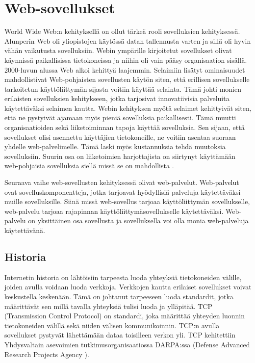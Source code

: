 \documentclass[utf8]{gradu3}
\begin{document}
\chapter{Web-sovellukset}
World Wide Web:n kehityksellä on ollut tärkeä rooli sovelluksien kehityksessä. Alunperin Web oli yliopistojen käytössä datan tallennusta varten ja sillä oli hyvin vähän vaikutusta sovelluksiin. Webin ympärille kirjoitetut sovellukset olivat käynnissä paikallisissa tietokoneissa ja niihin oli vain pääsy organisaation sisällä. 2000-luvun alussa Web alkoi kehittyä laajemmin. Selaimiin lisätyt ominaisuudet mahdollistivat Web-pohjaisten sovellusten käytön siten, että erillisen sovellukselle tarkoitetun käyttöliittymän sijasta voitiin käyttää selainta. Tämä johti monien erilaisten sovelluksien kehitykseen, jotka tarjosivat innovatiivisia palveluita käytettäväksi selaimen kautta. Webin kehityksen myötä selaimet kehittyivät siten, että ne pystyivät ajamaan myös pieniä sovelluksia paikallisesti. Tämä muutti organisaatioiden sekä liiketoiminnan tapoja käyttää sovelluksia. Sen sijaan, että sovellukset olisi asennettu käyttäjien tietokoneille, ne voitiin asentaa suoraan yhdelle web-palvelimelle. Tämä laski myös kustannuksia tehdä muutoksia sovelluksiin. Suurin osa on liiketoimien harjottajista on siirtynyt käyttämään web-pohjaisia sovelluksia siellä missä se on mahdollista \cite{Sommerville, Software eningeering and the Web}.

Seuraava vaihe web-sovellusten kehityksessä olivat web-palvelut. Web-palvelut ovat sovelluskomponentteja, jotka tarjoavat hyödyllisiä palveluja käytettäväksi muille sovelluksille. Siinä missä web-sovellus tarjoaa käyttöliittymän sovellukselle, web-palvelu tarjoaa rajapinnan käyttöliittymäsovellukselle käytettäväksi. Web-palvelu on yksittäinen osa sovellusta ja sovelluksella voi olla monia web-palveluja käytettävänä. 

\section{Historia}
Internetin historia on lähtöisiin tarpeesta luoda yhteyksiä tietokoneiden välille, joiden avulla voidaan luoda verkkoja. Verkkojen kautta erilaiset sovellukset voivat keskustella keskenään. Tämä on johtanut tarpeeseen luoda standardit, jotka määrittävät sen millä tavalla yhteyksiä tulisi luoda ja ylläpitää. TCP (Transmission Control Protocol) on standardi, joka määrittää yhteyden luonnin tietokoneiden välillä sekä niiden välisen kommunikoinnin. TCP:n avulla sovellukset pystyvät lähettämään dataa toisilleen verkon yli. TCP kehitettiin Yhdysvaltain asevoimien tutkimusorganisaatiossa DARPA:ssa (Defense Advanced Research Projects Agency )\cite{tcp}. 
\end{document}
